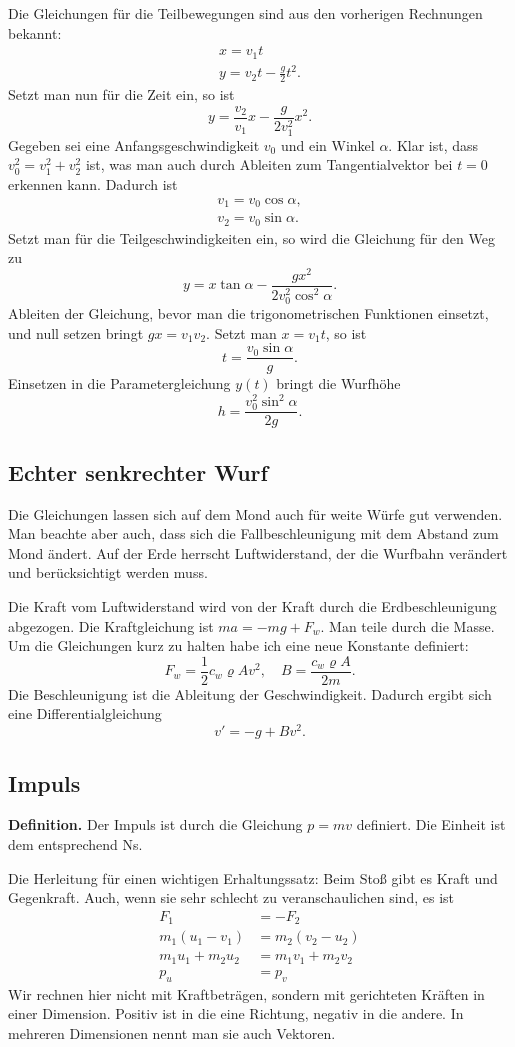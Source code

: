 \documentclass[a4paper,11pt,fleqn,twocolumn,twoside,dvipdfmx]{scrartcl}
\begin{document}
Die Gleichungen für die Teilbewegungen sind aus den vorherigen
Rechnungen bekannt:%
\begin{gather*}
x = v_1t\\
y = v_2t - \frac{g}{2}t^2.
\end{gather*}
Setzt man nun für die Zeit ein, so ist%
\[y = \frac{v_2}{v_1}x - \frac{g}{2v_1^2} x^2.\]
Gegeben sei eine Anfangsgeschwindigkeit $v_0$ und ein
Winkel $\alpha$. Klar ist, dass $v_0^2=v_1^2+v_2^2$ ist,
was man auch durch Ableiten zum Tangentialvektor bei $t=0$
erkennen kann. Dadurch ist%
\begin{gather*}
v_1 = v_0\cos\alpha,\\
v_2 = v_0\sin\alpha.
\end{gather*}
Setzt man für die Teilgeschwindigkeiten ein, so wird die Gleichung
für den Weg zu%
\[y = x\tan\alpha - \frac{gx^2}{2v_0^2\cos^2\alpha}.\]
Ableiten der Gleichung, bevor man die trigonometrischen Funktionen
einsetzt, und null setzen bringt $gx = v_1v_2$.
Setzt man $x=v_1t$, so ist%
\[t = \frac{v_0\sin\alpha}{g}.\]
Einsetzen in die Parametergleichung $y(t)$ bringt die Wurfhöhe%
\[h = \frac{v_0^2\sin^2\alpha}{2g}.\]

\subsection{Echter senkrechter Wurf}

Die Gleichungen lassen sich auf dem Mond auch für weite Würfe gut
verwenden. Man beachte aber auch, dass sich die Fall{}beschleunigung
mit dem Abstand zum Mond ändert. Auf der Erde herrscht Luftwiderstand,
der die Wurfbahn verändert und berücksichtigt werden muss.

Die Kraft vom Luftwiderstand wird von der Kraft durch die
Erdbeschleunigung abgezogen. Die Kraftgleichung ist $ma = -mg + F_w$.
Man teile durch die Masse. Um die Gleichungen kurz zu halten habe
ich eine neue Konstante definiert:%
\[F_w = \frac{1}{2}c_w\varrho Av^2,\quad B = \frac{c_w\varrho A}{2m}.\]
Die Beschleunigung ist die Ableitung der Geschwindigkeit.
Dadurch ergibt sich eine Differentialgleichung%
\[v' = -g + Bv^2.\]

\subsection{Impuls}

\textbf{Definition.} Der Impuls ist durch die Gleichung $p=mv$
definiert. Die Einheit ist dem entsprechend Ns.

Die Herleitung für einen wichtigen Erhaltungssatz: Beim Stoß gibt es
Kraft und Gegenkraft. Auch, wenn sie sehr schlecht zu
veranschaulichen sind, es ist%
\begin{align*}
F_1 &= -F_2\\
m_1(u_1-v_1) &= m_2(v_2-u_2)\\
m_1u_1+m_2u_2 &= m_1v_1+m_2v_2\\
p_u &= p_v
\end{align*}
Wir rechnen hier nicht mit Kraftbeträgen, sondern mit
gerichteten Kräften in einer Dimension. Positiv ist in die
eine Richtung, negativ in die andere. In mehreren Dimensionen nennt
man sie auch Vektoren.
\end{document}
